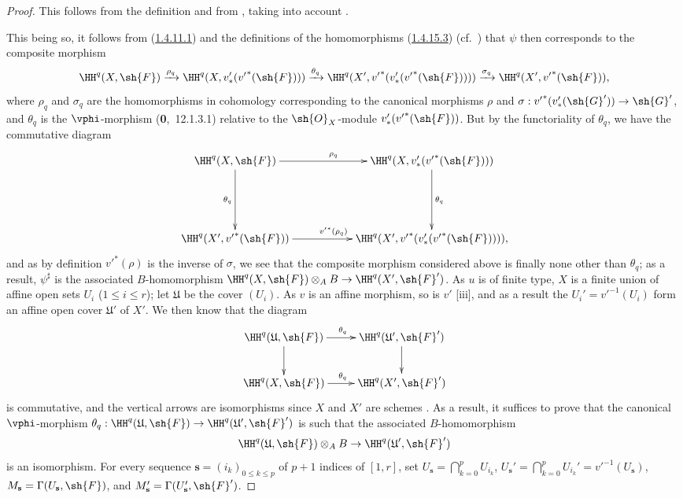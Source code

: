\begin{proof}
This follows from the definition  and from , taking into account .

This being so, it follows from (\hyperref[III.1.4.11.1]{1.4.11.1}) and the definitions of the homomorphisms (\hyperref[III.1.4.15.3]{1.4.15.3}) (cf.~) that $\psi$ then corresponds to the composite morphism
\[
  \HH^q(X,\sh{F})\xrightarrow{\rho_q}\HH^q(X,v_*'({v'}^*(\sh{F})))\xrightarrow{\theta_q}\HH^q(X',{v'}^*(v_*'({v'}^*(\sh{F}))))\xrightarrow{\sigma_q}\HH^q(X',{v'}^*(\sh{F})),
\]
where $\rho_q$ and $\sigma_q$ are the homomorphisms in cohomology corresponding to the canonical morphisms $\rho$ and $\sigma:{v'}^*(v_*'(\sh{G}'))\to\sh{G}'$, and $\theta_q$ is the $\vphi$-morphism (\textbf{0},~12.1.3.1) relative to the $\sh{O}_X$-module $v_*'({v'}^*(\sh{F}))$.
But by the functoriality of $\theta_q$, we have the commutative diagram
\[
  \xymatrix{
    \HH^q(X,\sh{F})\ar[rr]^{\rho_q}\ar[dd]_{\theta_q} & &
    \HH^q(X,v_*'({v'}^*(\sh{F})))\ar[dd]^{\theta_q}\\\\
    \HH^q(X',{v'}^*(\sh{F}))\ar[rr]^{{v'}^*(\rho_q)} & &
    \HH^q(X',{v'}^*(v_*'({v'}^*(\sh{F})))),
  }
\]
and as by definition  ${v'}^*(\rho)$ is the inverse of $\sigma$, we see that the composite morphism considered above is finally none other than $\theta_q$; as a result, $\psi^\sharp$ is the associated $B$-homomorphism $\HH^q(X,\sh{F})\otimes_A B\to\HH^q(X',\sh{F}')$.
As $u$ is of finite type, $X$ is a finite union of affine open sets $U_i$ ($1\leq i\leq r$); let $\mathfrak{U}$ be the cover $(U_i)$.
As $v$ is an affine morphism, so is $v'$ [iii], and as a result the $U_i'={v'}^{-1}(U_i)$ form an affine open cover $\mathfrak{U}'$ of $X'$.
We then know  that the diagram
\[
  \xymatrix{
    \HH^q(\mathfrak{U},\sh{F})\ar[r]^{\theta_q}\ar[d] &
    \HH^q(\mathfrak{U}',\sh{F}')\ar[d]\\
    \HH^q(X,\sh{F})\ar[r]^{\theta_q} &
    \HH^q(X',\sh{F}')
  }
\]
is commutative, and the vertical arrows are isomorphisms since $X$ and $X'$ are schemes .
As a result, it suffices to prove that the canonical $\vphi$-morphism $\theta_q:\HH^q(\mathfrak{U},\sh{F})\to\HH^q(\mathfrak{U}',\sh{F}')$ is such that the associated $B$-homomorphism
\[
  \HH^q(\mathfrak{U},\sh{F})\otimes_A B\to\HH^q(\mathfrak{U}',\sh{F}')
\]
is an isomorphism.
For every sequence $\mathbf{s}=(i_k)_{0\leq k\leq p}$ of $p+1$ indices of $[1,r]$, set $U_\mathbf{s}=\bigcap_{k=0}^p U_{i_k}$, $U_\mathbf{s}'=\bigcap_{k=0}^p U_{i_k}'={v'}^{-1}(U_\mathbf{s})$, $M_\mathbf{s}=\Gamma(U_\mathbf{s},\sh{F})$, and $M_\mathbf{s}'=\Gamma(U_\mathbf{s}',\sh{F}')$.

\end{proof}
